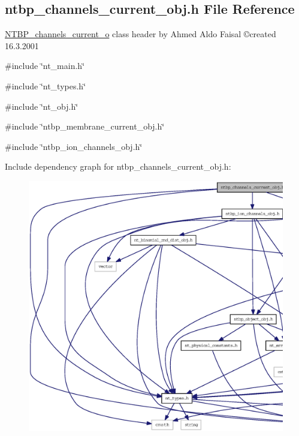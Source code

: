 \subsection{ntbp\_\-channels\_\-current\_\-obj.h File Reference}
\label{ntbp__channels__current__obj_8h}



\begin{DoxyItemize}
\item \hyperlink{class_n_t_b_p__channels__current__o}{NTBP\_\-channels\_\-current\_\-o} class header by Ahmed Aldo Faisal \copyright created 16.3.2001 
\end{DoxyItemize} 


{\ttfamily \#include \char`\"{}nt\_\-main.h\char`\"{}}\par
{\ttfamily \#include \char`\"{}nt\_\-types.h\char`\"{}}\par
{\ttfamily \#include \char`\"{}nt\_\-obj.h\char`\"{}}\par
{\ttfamily \#include \char`\"{}ntbp\_\-membrane\_\-current\_\-obj.h\char`\"{}}\par
{\ttfamily \#include \char`\"{}ntbp\_\-ion\_\-channels\_\-obj.h\char`\"{}}\par
Include dependency graph for ntbp\_\-channels\_\-current\_\-obj.h:
\nopagebreak
\begin{figure}[H]
\begin{center}
\leavevmode
\includegraphics[width=400pt]{ntbp__channels__current__obj_8h__incl}
\end{center}
\end{figure}
